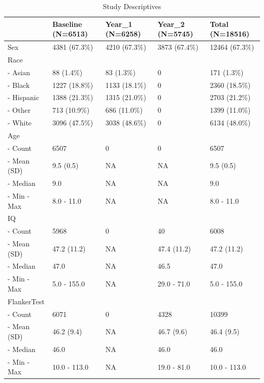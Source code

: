\documentclass{article}
\begin{document}
\begin{table}

\caption{\label{tab:descriptives}Study Descriptives}
\centering
\fontsize{10}{12}\selectfont
\begin{tabular}[t]{>{}l||>{}l||>{}l||>{}l||l}
\hline
 & Baseline (N=6513) & Year\_1 (N=6258) & Year\_2 (N=5745) & Total (N=18516)\\
\hline
Sex & 4381 (67.3\%) & 4210 (67.3\%) & 3873 (67.4\%) & 12464 (67.3\%)\\
\hline
Race &  &  &  & \\
\hline
-  Asian & 88 (1.4\%) & 83 (1.3\%) & 0 & 171 (1.3\%)\\
\hline
-  Black & 1227 (18.8\%) & 1133 (18.1\%) & 0 & 2360 (18.5\%)\\
\hline
-  Hispanic & 1388 (21.3\%) & 1315 (21.0\%) & 0 & 2703 (21.2\%)\\
\hline
-  Other & 713 (10.9\%) & 686 (11.0\%) & 0 & 1399 (11.0\%)\\
\hline
-  White & 3096 (47.5\%) & 3038 (48.6\%) & 0 & 6134 (48.0\%)\\
\hline
Age &  &  &  & \\
\hline
-  Count & 6507 & 0 & 0 & 6507\\
\hline
-  Mean (SD) & 9.5 (0.5) & NA & NA & 9.5 (0.5)\\
\hline
-  Median & 9.0 & NA & NA & 9.0\\
\hline
-  Min -
                                                 Max & 8.0 - 11.0 & NA & NA & 8.0 - 11.0\\
\hline
IQ &  &  &  & \\
\hline
-  Count & 5968 & 0 & 40 & 6008\\
\hline
-  Mean (SD) & 47.2 (11.2) & NA & 47.4 (11.2) & 47.2 (11.2)\\
\hline
-  Median & 47.0 & NA & 46.5 & 47.0\\
\hline
-  Min -
                                                 Max & 5.0 - 155.0 & NA & 29.0 - 71.0 & 5.0 - 155.0\\
\hline
FlankerTest &  &  &  & \\
\hline
-  Count & 6071 & 0 & 4328 & 10399\\
\hline
-  Mean (SD) & 46.2 (9.4) & NA & 46.7 (9.6) & 46.4 (9.5)\\
\hline
-  Median & 46.0 & NA & 46.0 & 46.0\\
\hline
-  Min -
                                                 Max & 10.0 - 113.0 & NA & 19.0 - 81.0 & 10.0 - 113.0\\

\end{tabular}
\end{table}
\end{document}

